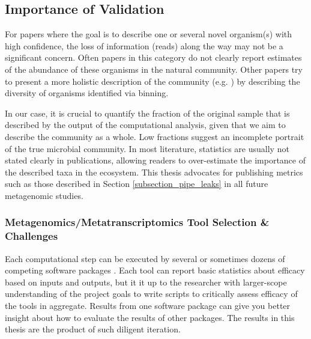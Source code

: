 \subsection{Importance of Validation}
For papers where the goal is to describe one or several novel organism(s) with high confidence, the loss of information (reads) along the way may not be a significant concern.
Often papers in this category do not clearly report estimates of the abundance of these organisms in the natural community.
Other papers try to present a more holistic description of the community (e.g. \cite{kantor2017}) by describing the diversity of organisms identified via binning.

In our case, it is crucial to quantify the fraction of the original sample that is described by the output of the computational analysis, given that we aim to describe the community as a whole.
Low fractions suggest an incomplete portrait of the true microbial community.
In most literature, statistics are usually not stated clearly in publications, allowing readers to over-estimate the importance of the described taxa in the ecosystem.
This thesis advocates for publishing metrics such as those described in Section \ref{subsection_pipe_leaks} in all future metagenomic studies.

\subsubsection{Metagenomics/Metatranscriptomics Tool Selection \& Challenges}   %
Each computational step can be executed by several or sometimes dozens of competing software packages \cite{sangwan2016,thomas2012}.
Each tool can report basic statistics about efficacy based on inputs and outputs, but it it up to the researcher with larger-scope understanding of the project goals to write scripts to critically assess efficacy of the tools in aggregate.
Results from one software package can give you better insight about how to evaluate the results of other packages.
The results in this thesis are the product of such diligent iteration.

